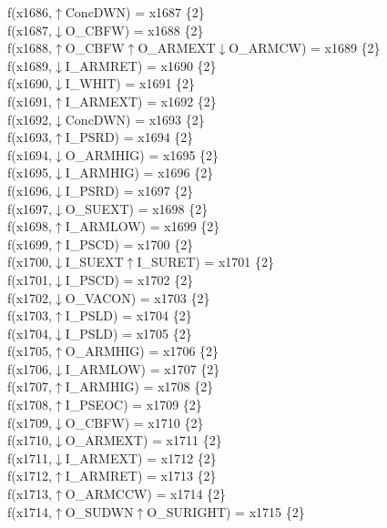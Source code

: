 f(x1686,$\uparrow$ConcDWN) = x1687 \{2\} \\  
f(x1687,$\downarrow$O\_CBFW) = x1688 \{2\} \\  
f(x1688,$\uparrow$O\_CBFW$\uparrow$O\_ARMEXT$\downarrow$O\_ARMCW) = x1689 \{2\} \\  
f(x1689,$\downarrow$I\_ARMRET) = x1690 \{2\} \\  
f(x1690,$\downarrow$I\_WHIT) = x1691 \{2\} \\  
f(x1691,$\uparrow$I\_ARMEXT) = x1692 \{2\} \\  
f(x1692,$\downarrow$ConcDWN) = x1693 \{2\} \\  
f(x1693,$\uparrow$I\_PSRD) = x1694 \{2\} \\  
f(x1694,$\downarrow$O\_ARMHIG) = x1695 \{2\} \\  
f(x1695,$\downarrow$I\_ARMHIG) = x1696 \{2\} \\  
f(x1696,$\downarrow$I\_PSRD) = x1697 \{2\} \\  
f(x1697,$\downarrow$O\_SUEXT) = x1698 \{2\} \\  
f(x1698,$\uparrow$I\_ARMLOW) = x1699 \{2\} \\  
f(x1699,$\uparrow$I\_PSCD) = x1700 \{2\} \\  
f(x1700,$\downarrow$I\_SUEXT$\uparrow$I\_SURET) = x1701 \{2\} \\  
f(x1701,$\downarrow$I\_PSCD) = x1702 \{2\} \\  
f(x1702,$\downarrow$O\_VACON) = x1703 \{2\} \\  
f(x1703,$\uparrow$I\_PSLD) = x1704 \{2\} \\  
f(x1704,$\downarrow$I\_PSLD) = x1705 \{2\} \\  
f(x1705,$\uparrow$O\_ARMHIG) = x1706 \{2\} \\  
f(x1706,$\downarrow$I\_ARMLOW) = x1707 \{2\} \\  
f(x1707,$\uparrow$I\_ARMHIG) = x1708 \{2\} \\  
f(x1708,$\uparrow$I\_PSEOC) = x1709 \{2\} \\  
f(x1709,$\downarrow$O\_CBFW) = x1710 \{2\} \\  
f(x1710,$\downarrow$O\_ARMEXT) = x1711 \{2\} \\  
f(x1711,$\downarrow$I\_ARMEXT) = x1712 \{2\} \\  
f(x1712,$\uparrow$I\_ARMRET) = x1713 \{2\} \\  
f(x1713,$\uparrow$O\_ARMCCW) = x1714 \{2\} \\  
f(x1714,$\uparrow$O\_SUDWN$\uparrow$O\_SURIGHT) = x1715 \{2\} \\  
